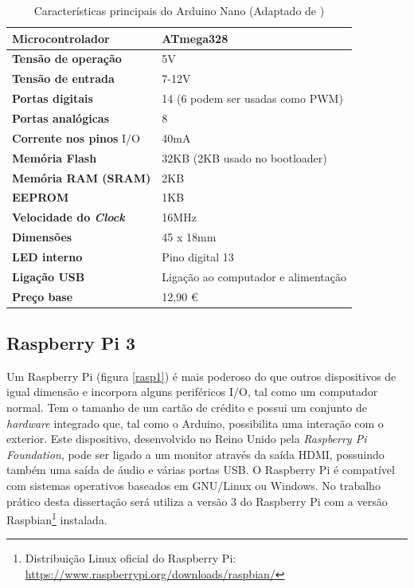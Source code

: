 \begin{table}[h]
	\centering
	
	\begin{tabular}{|
			>{\columncolor[HTML]{EFEFEF}}l |l|} \hline
		\textbf{Microcontrolador} & ATmega328 \\ \hline
		\textbf{Tensão de operação} & 5V \\ \hline
		\textbf{Tensão de entrada} & 7-12V \\ \hline
		\textbf{Portas digitais} & 14 (6 podem ser usadas como PWM) \\ \hline
		\textbf{Portas analógicas} & 8 \\ \hline
		\textbf{Corrente nos pinos} \ac{I/O} & 40mA \\ \hline
		\textbf{Memória Flash} & 32KB (2KB usado no bootloader) \\ \hline
		\textbf{Memória \acs{RAM} (SRAM)} & 2KB \\ \hline
		\textbf{EEPROM} & 1KB \\ \hline
		\textbf{Velocidade do \textit{Clock}} & 16MHz \\ \hline
		\textbf{Dimensões} & 45 x 18mm \\ \hline
		\textbf{\ac{LED} interno} & Pino digital 13 \\ \hline
		\textbf{Ligação \ac{USB}} & Ligação ao computador e alimentação \\ \hline
		\textbf{Preço base} & 12,90 \euro \footnotemark  \\ \hline
	\end{tabular}
	\caption[Características principais do Arduino Nano]{Características principais do Arduino Nano (Adaptado de \cite{Melorose2015})}
	\label{caraarduino}
\end{table}





\subsection{Raspberry Pi 3}

Um Raspberry Pi (figura \ref{rasp1}) é mais poderoso do que outros dispositivos de igual dimensão e incorpora alguns periféricos \ac{I/O}, tal como um computador normal. Tem o tamanho de um cartão de crédito e possui um conjunto de \textit{hardware} integrado que, tal como o Arduino, possibilita uma interação com o exterior. Este dispositivo, desenvolvido no Reino Unido pela \textit{Raspberry Pi Foundation}, pode ser ligado a um monitor através da saída HDMI, possuindo também uma saída de áudio e várias portas \ac{USB}. O Raspberry Pi é compatível com sistemas operativos baseados em GNU/Linux ou Windows. No trabalho prático desta dissertação será utiliza a versão 3 do Raspberry Pi com a versão Raspbian\footnote{Distribuição Linux oficial do Raspberry Pi:  \url{https://www.raspberrypi.org/downloads/raspbian/}} instalada\cite{RaspberryPiFoundation2012}.

